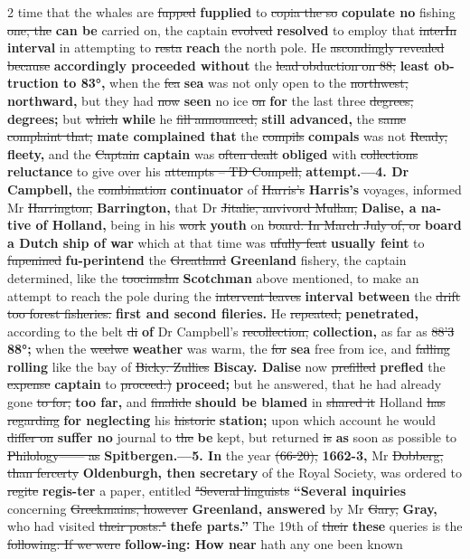 \documentclass[10pt]{article}
\begin{document}
\begin{multicols}{2}
time that the whales are \sout{fupped} \textbf{fupplied} to \sout{copia the so} \textbf{copulate no} fishing \sout{one, the} \textbf{can be} carried on, the captain \sout{evolved} \textbf{resolved} to employ that \sout{interIn} \textbf{interval} in attempting to \sout{resta} \textbf{reach} the north pole. He \sout{ascondingly revealed because} \textbf{accordingly proceeded without} the \sout{lead obduction on 88;} \textbf{least ob-truction to 83°,} when the \sout{fea} \textbf{sea} was not only open to the \sout{northwest,} \textbf{northward,} but they had \sout{now} \textbf{seen} no ice \sout{on} \textbf{for} the last three \sout{degrees,} \textbf{degrees;} but \sout{which} \textbf{while} he \sout{fill announced,} \textbf{still advanced,} the \sout{same complaint that,} \textbf{mate complained that} the \sout{compils} \textbf{compals} was not \sout{Ready,} \textbf{fleety,} and the \sout{Captain} \textbf{captain} was \sout{often dealt} \textbf{obliged} with \sout{collections} \textbf{reluctance} to give over his \sout{attempts – TD Compell,} \textbf{attempt.—4. Dr Campbell,} the \sout{combination} \textbf{continuator} of \sout{Harris’s} \textbf{Harris's} voyages, informed Mr \sout{Harrington,} \textbf{Barrington,} that Dr \sout{Jitalie, anvivord Mullan,} \textbf{Dalise, a na-tive of Holland,} being in his \sout{work} \textbf{youth} on \sout{board. In March July of, or} \textbf{board a Dutch ship of war} which at that time was \sout{ufully feat} \textbf{usually feint} to \sout{fupenined} \textbf{fu-perintend} the \sout{Greatland} \textbf{Greenland} fishery, the captain determined, like the \sout{toocimshn} \textbf{Scotchman} above mentioned, to make an attempt to reach the pole during the \sout{intervent leaves} \textbf{interval between} the \sout{drift too forest fisheries.} \textbf{first and second fileries.} He \sout{repeated,} \textbf{penetrated,} according to the belt \sout{di} \textbf{of} Dr Campbell's \sout{recollection,} \textbf{collection,} as far as \sout{88'3} \textbf{88°;} when the \sout{weelwe} \textbf{weather} was warm, the \sout{for} \textbf{sea} free from ice, and \sout{falling} \textbf{rolling} like the bay of \sout{Bicky. Zullies} \textbf{Biscay. Dalise} now \sout{prefilled} \textbf{prefled} the \sout{expense} \textbf{captain} to \sout{proceed:)} \textbf{proceed;} but he answered, that he had already gone \sout{to for,} \textbf{too far,} and \sout{finalide} \textbf{should be blamed} in \sout{shared it} Holland \sout{has regarding} \textbf{for neglecting} his \sout{historic} \textbf{station;} upon which account he would \sout{differ on} \textbf{suffer no} journal to \sout{the} \textbf{be} kept, but returned \sout{is} \textbf{as} soon as possible to \sout{Philology—— as} \textbf{Spitbergen.—5. In} the year \sout{(66-20),} \textbf{1662-3,} Mr \sout{Dobberg, than fercerty} \textbf{Oldenburgh, then secretary} of the Royal Society, was ordered to \sout{regite} \textbf{regis-ter} a paper, entitled \sout{"Several linguists} \textbf{“Several inquiries} concerning \sout{Greekmains, however} \textbf{Greenland, answered} by Mr \sout{Gary,} \textbf{Gray,} who had visited \sout{their posts."} \textbf{thefe parts.”} The 19th of \sout{their} \textbf{these} queries is the \sout{following: If we were} \textbf{follow-ing: How near} hath any one been known 
\end{multicols}
\end{document}
